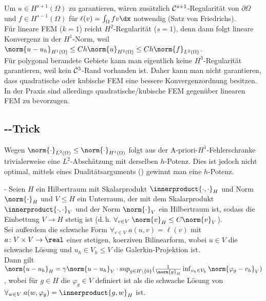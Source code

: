 \linie

\begin{Bem}
    Um $u \in H^{s+1}(\Omega)$ zu garantieren, wären zusätzlich
    $\mathcal{C}^{s+1}$-Regularität von $\partial\Omega$ und $f \in H^{s-1}(\Omega)$ für
    $\ell(v) = \int_\Omega fv \dx$ notwendig (Satz von Friedrichs).\\
    Für lineare FEM ($k = 1$) reicht $H^2$-Regularität ($s = 1$),
    denn dann folgt lineare Konvergenz in der $H^1$-Norm, weil
    $\norm{u - u_h}_{H^1(\Omega)} \le Ch\norm{u}_{H^2(\Omega)} \le Ch\norm{f}_{L^2(\Omega)}$.\\
    Für polygonal berandete Gebiete kann man eigentlich keine $H^3$-Regularität garantieren,
    weil kein $\mathcal{C}^3$-Rand vorhanden ist.
    Daher kann man nicht garantieren, dass quadratische oder kubische FEM eine bessere
    Konvergenzordnung besitzen.
    In der Praxis sind allerdings quadratische/kubische FEM gegenüber linearen FEM
    zu bevorzugen.
\end{Bem}

\subsection{%
    --Trick%
}

\begin{Bem}
    Wegen $\norm{\cdot}_{L^2(\Omega)} \le \norm{\cdot}_{H^1(\Omega)}$
    folgt aus der A-priori-$H^1$-Fehlerschranke trivialerweise eine $L^2$-Abschätzung
    mit derselben $h$-Potenz.
    Dies ist jedoch nicht optimal, mittels eines Dualitätsarguments
    () gewinnt man eine $h$-Potenz.
\end{Bem}

\begin{Satz}{-}
    Seien $H$ ein Hilbertraum mit Skalarprodukt $\innerproduct{\cdot, \cdot}_H$ und Norm $\norm{\cdot}_H$
    und $V \le H$ ein Unterraum, der mit dem Skalarprodukt
    $\innerproduct{\cdot, \cdot}_V$ und der Norm $\norm{\cdot}_V$ ein Hilbertraum ist,
    sodass die Einbettung $V \to H$ stetig ist
    (d.\,h. $\forall_{v \in V}\; \norm{v}_H \le C \norm{v}_V$).\\
    Sei außerdem die schwache Form $\forall_{v \in V}\; a(u, v) = \ell(v)$
    mit $a\colon V \times V \to \real$ einer stetigen, koerziven Bilinearform,
    wobei $u \in V$ die schwache Lösung und $u_h \in V_h \le V$
    die Galerkin-Projektion ist.\\
    Dann gilt $\norm{u - u_h}_H = \gamma \norm{u - u_h}_V \cdot
    \sup_{g \in H \setminus \{0\}} (\frac{1}{\norm{g}_H} \inf_{v_h \in V_h}
    \norm{\varphi_g - v_h}_V)$,
    wobei für $g \in H$ die  $\varphi_g \in V$ definiert ist als
    die schwache Lösung von $\forall_{w \in V}\; a(w, \varphi_g) = \innerproduct{g, w}_H$ ist.
\end{Satz}

